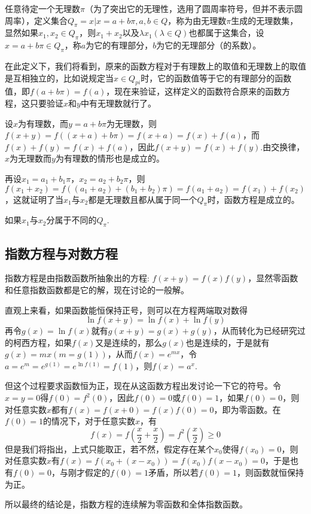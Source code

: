 任意待定一个无理数$\pi$（为了突出它的无理性，选用了圆周率符号，但并不表示圆周率），定义集合$Q_{\pi}={x|x=a+b\pi,a,b\in Q}$，称为由无理数$\pi$生成的无理数集，显然如果$x_1,x_2 \in Q_{\pi}$，则$x_1+x_2$以及$\lambda x_1 (\lambda \in Q)$也都属于这集合，设$x=a+b\pi \in Q_{\pi}$，称$a$为它的有理部分，$b$为它的无理部分（的系数）。

在此定义下，我们将看到，原来的函数方程对于有理数上的取值和无理数上的取值是互相独立的，比如说规定当$x \in Q_{pi}$时，它的函数值等于它的有理部分的函数值，即$f(a+b\pi)=f(a)$，现在来验证，这样定义的函数符合原来的函数方程，这只要验证$x$和$y$中有无理数就行了。

设$x$为有理数，而$y=a+b\pi$为无理数，则$f(x+y)=f((x+a)+b\pi)=f(x+a)=f(x)+f(a)$，而$f(x)+f(y)=f(x)+f(a)$，因此$f(x+y)=f(x)+f(y)$.由交换律，$x$为无理数而$y$为有理数的情形也是成立的。

再设$x_1=a_1+b_1\pi$，$x_2=a_2+b_2\pi$，则$f(x_1+x_2)=f((a_1+a_2)+(b_1+b_2)\pi)=f(a_1+a_2)=f(x_1)+f(x_2)$，这就证明了当$x_1$与$x_2$都是无理数且都从属于同一个$Q_{\pi}$时，函数方程是成立的。

如果$x_1$与$x_2$分属于不同的$Q_{\pi}$.

\subsection{指数方程与对数方程}
\label{sec:exponent-equation-and-logarithm-equation}

指数方程是由指数函数所抽象出的方程: $f(x+y)=f(x)f(y)$，显然零函数和任意指数函数都是它的解，现在讨论的一般解。

直观上来看，如果函数能恒保持正号，则可以在方程两端取对数得
\[ \ln{f(x+y)} = \ln{f(x)} + \ln{f(y)} \]
再令$g(x)=\ln{f(x)}$就有$g(x+y)=g(x)+g(y)$，从而转化为已经研究过的柯西方程，如果$f(x)$又是连续的，那么$g(x)$也是连续的，于是就有$g(x)=mx(m=g(1))$，从而$f(x)=e^{mx}$，令$a=e^m=e^{g(1)}=e^{\ln{f(1)}}=f(1)$，则$f(x)=a^x$.

但这个过程要求函数恒为正，现在从这函数方程出发讨论一下它的符号。令$x=y=0$得$f(0)=f^2(0)$，因此$f(0)=0$或$f(0)=1$，如果$f(0)=0$，则对任意实数$x$都有$f(x)=f(x+0)=f(x)f(0)=0$，即为零函数。在$f(0)=1$的情况下，对于任意实数$x$，有
\[ f(x) = f\left( \frac{x}{2} + \frac{x}{2} \right) = f^2 \left( \frac{x}{2} \right) \geqslant 0 \]
但是我们将指出，上式只能取正，若不然，假定存在某个$x_0$使得$f(x_0)=0$，则对任意实数$x$有$f(x)=f(x_0+(x-x_0))=f(x_0)f(x-x_0)=0$，于是也有$f(0)=0$，与刚才假定的$f(0)=1$矛盾，所以若$f(0)=1$，则函数就恒保持为正。

所以最终的结论是，指数方程的连续解为零函数和全体指数函数。

